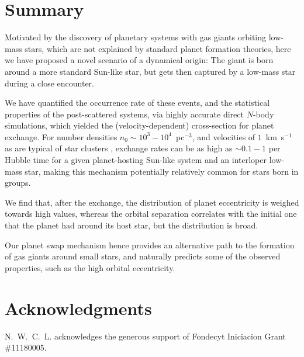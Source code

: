 \documentclass[twocolumn]{aastex62}
\begin{document}
\section{Summary}
Motivated by the discovery of planetary systems with gas giants orbiting low-mass stars, which are not explained 
by standard planet formation theories, here we have proposed a novel scenario of a dynamical origin:  The giant is born around a more standard Sun-like star, but gets then captured by a low-mass star during a close encounter. 

We have quantified the occurrence rate of these events, and the statistical properties of the post-scattered systems, via 
highly accurate direct $N$-body simulations, which yielded the (velocity-dependent) cross-section for planet exchange.
For number densities $n_0\sim 10^3-10^4$~pc$^{-3}$, and
velocities of $1$~km~s$^{-1}$
as are typical of star clusters \citep{Adams2001},
exchange rates can be as high as $\sim 0.1-1$ per Hubble time  for a given planet-hosting Sun-like system and an interloper low-mass star, making this mechanism potentially relatively common for stars born in groups.



We find that, after the exchange, the
distribution of planet eccentricity is weighed towards high values, whereas the
  orbital separation  correlates with the initial one that the planet had around its host star, but the distribution is broad.
  
  
  Our planet swap mechanism hence provides an alternative path to the formation of gas giants around small stars, and naturally predicts some of the observed properties, such as the high orbital eccentricity.


\section*{Acknowledgments}

N.~W.~C.~L. acknowledges the generous support of Fondecyt Iniciacion Grant \#11180005. 








\end{document}
